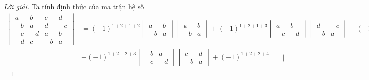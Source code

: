 \documentclass[class=linearalgebra,crop=false]{standalone}
\begin{document}
\begin{proof}[Lời giải]
    \par Ta tính định thức của ma trận hệ số
    \begingroup
    \allowdisplaybreaks
    \begin{align*}
        \begin{vmatrix}
            a  & b  & c  & d  \\
            -b & a  & d  & -c \\
            -c & -d & a  & b  \\
            -d & c  & -b & a
        \end{vmatrix}
         & = (-1)^{1+2+1+2}
        \begin{vmatrix}
            a  & b \\
            -b & a
        \end{vmatrix}
        \begin{vmatrix}
            a  & b \\
            -b & a
        \end{vmatrix}
        + (-1)^{1+2+1+3}
        \begin{vmatrix}
            a  & b  \\
            -c & -d
        \end{vmatrix}
        \begin{vmatrix}
            d  & -c \\
            -b & a
        \end{vmatrix}
        + (-1)^{1+2+1+4}
        \begin{vmatrix}
            a  & b \\
            -d & c
        \end{vmatrix}
        \begin{vmatrix}
            d & -c \\
            a & b
        \end{vmatrix}                                                                                             \\
         & + (-1)^{1+2+2+3}
        \begin{vmatrix}
            -b & a  \\
            -c & -d
        \end{vmatrix}
        \begin{vmatrix}
            c  & d \\
            -b & a
        \end{vmatrix}
        + (-1)^{1+2+2+4}
        \begin{vmatrix}

\end{vmatrix}
\end{align*}
\end{proof}
\end{document}
